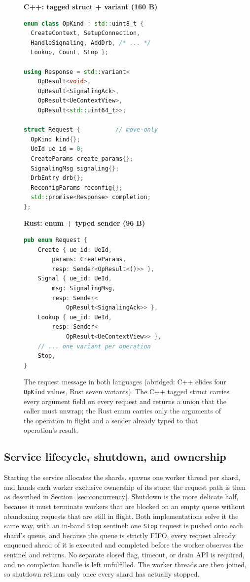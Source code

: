 \documentclass[english,twoside,openright,a4paper,censored,csm,software-track-2020]{HYthesisML}
\begin{document}
\begin{figure}
\begin{minipage}[t]{0.50\linewidth}
\textbf{\footnotesize C++: tagged struct + variant (160 B)}
\begin{lstlisting}[language=C++]
enum class OpKind : std::uint8_t {
  CreateContext, SetupConnection,
  HandleSignaling, AddDrb, /* ... */
  Lookup, Count, Stop };

using Response = std::variant<
    OpResult<void>,
    OpResult<SignalingAck>,
    OpResult<UeContextView>,
    OpResult<std::uint64_t>>;

struct Request {          // move-only
  OpKind kind{};
  UeId ue_id = 0;
  CreateParams create_params{};
  SignalingMsg signaling{};
  DrbEntry drb{};
  ReconfigParams reconfig{};
  std::promise<Response> completion;
};
\end{lstlisting}
\end{minipage}\hfill
\begin{minipage}[t]{0.46\linewidth}
\textbf{\footnotesize Rust: enum + typed sender (96 B)}
\begin{lstlisting}[language=Rust]
pub enum Request {
    Create { ue_id: UeId,
        params: CreateParams,
        resp: Sender<OpResult<()>> },
    Signal { ue_id: UeId,
        msg: SignalingMsg,
        resp: Sender<
            OpResult<SignalingAck>> },
    Lookup { ue_id: UeId,
        resp: Sender<
            OpResult<UeContextView>> },
    // ... one variant per operation
    Stop,
}
\end{lstlisting}
\end{minipage}
\caption[The request message in both languages]{The request message in both languages (abridged: C++ elides four \texttt{OpKind}
values, Rust seven variants). The C++ tagged struct carries every argument field on every
request and returns a union that the caller must unwrap; the Rust enum carries only the
arguments of the operation in flight and a sender already typed to that operation's
result.\label{lst:request}}
\end{figure}

\subsection{Service lifecycle, shutdown, and ownership}
Starting the service allocates the shards, spawns one worker thread per shard, and hands each
worker exclusive ownership of its store; the request path is then as described in
Section~\ref{sec:concurrency}. Shutdown is the more delicate half, because it must terminate
workers that are blocked on an empty queue without abandoning requests that are still in
flight. Both implementations solve it the same way, with an in-band \texttt{Stop} sentinel:
one \texttt{Stop} request is pushed onto each shard's queue, and because the queue is strictly
FIFO, every request already enqueued ahead of it is executed and completed before the worker
observes the sentinel and returns. No separate closed flag, timeout, or drain API is required,
and no completion handle is left unfulfilled. The worker threads are then joined, so shutdown
returns only once every shard has actually stopped.
\end{document}
